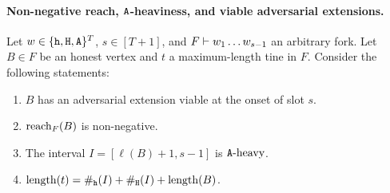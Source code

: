 
      






\paragraph{Non-negative reach, $\mathtt{A}$-heaviness, and viable adversarial extensions.}
Let $w \in \{\mathtt{h}, \mathtt{H}, \mathtt{A}\}^T$,   
$s \in [T + 1]$, and 
$F \vdash w_1 \ldots w_{s - 1}$ an arbitrary fork. 
Let $B \in F$ be an honest vertex 
and $t$ a maximum-length tine in $F$.
Consider the following statements: 
\begin{enumerate}[label=(\alph*)]
  \item \label{fact-reach-part:viable-adv-ext} $B$ has an adversarial extension viable at the onset of slot $s$.
  \item \label{fact-reach-part:nonneg-reach} $\operatorname{reach}_{F}(B)$ is non-negative.
  \item \label{fact-reach-part:Aheavy} The interval $I = [\ell(B) + 1, s - 1]$ is $\mathtt{A}\text{-heavy}$. 
  \item \label{fact-reach-part:conservative} $\operatorname{length}(t) = \#_{\mathtt{h}}(I) + \#_{\mathtt{H}}(I) + \operatorname{length}(B)$.     
\end{enumerate}

